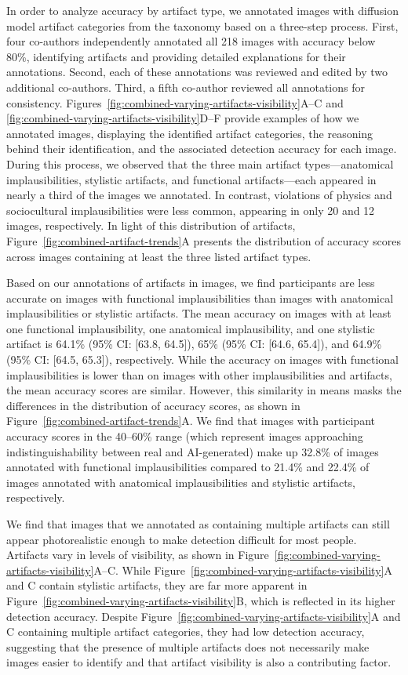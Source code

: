 In order to analyze accuracy by artifact type, we annotated images with diffusion model artifact categories from the taxonomy based on a three-step process. First, four co-authors independently annotated all 218 images with accuracy below 80\%, identifying artifacts and providing detailed explanations for their annotations. Second, each of these annotations was reviewed and edited by two additional co-authors. Third, a fifth co-author reviewed all annotations for consistency. Figures~\ref{fig:combined-varying-artifacts-visibility}A--C and \ref{fig:combined-varying-artifacts-visibility}D--F provide examples of how we annotated images, displaying the identified artifact categories, the reasoning behind their identification, and the associated detection accuracy for each image. During this process, we observed that the three main artifact types---anatomical implausibilities, stylistic artifacts, and functional artifacts---each appeared in nearly a third of the images we annotated. In contrast, violations of physics and sociocultural implausibilities were less common, appearing in only 20 and 12 images, respectively. In light of this distribution of artifacts, Figure~\ref{fig:combined-artifact-trends}A presents the distribution of accuracy scores across images containing at least the three listed artifact types.

Based on our annotations of artifacts in images, we find participants are less accurate on images with functional implausibilities than images with anatomical implausibilities or stylistic artifacts. The mean accuracy on images with at least one functional implausibility, one anatomical implausibility, and one stylistic artifact is 64.1\% (95\% CI: [63.8, 64.5]), 65\% (95\% CI: [64.6, 65.4]), and 64.9\% (95\% CI: [64.5, 65.3]), respectively. While the accuracy on images with functional implausibilities is lower than on images with other implausibilities and artifacts, the mean accuracy scores are similar. However, this similarity in means masks the differences in the distribution of accuracy scores, as shown in Figure~\ref{fig:combined-artifact-trends}A. We find that images with participant accuracy scores in the 40--60\% range (which represent images approaching indistinguishability between real and AI-generated) make up 32.8\% of images annotated with functional implausibilities compared to 21.4\% and 22.4\% of images annotated with anatomical implausibilities and stylistic artifacts, respectively. 


We find that images that we annotated as containing multiple artifacts can still appear photorealistic enough to make detection difficult for most people. Artifacts vary in levels of visibility, as shown in Figure~\ref{fig:combined-varying-artifacts-visibility}A--C. While Figure~\ref{fig:combined-varying-artifacts-visibility}A and C contain stylistic artifacts, they are far more apparent in Figure~\ref{fig:combined-varying-artifacts-visibility}B, which is reflected in its higher detection accuracy. Despite Figure~\ref{fig:combined-varying-artifacts-visibility}A and C containing multiple artifact categories, they had low detection accuracy, suggesting that the presence of multiple artifacts does not necessarily make images easier to identify and that artifact visibility is also a contributing factor. 


